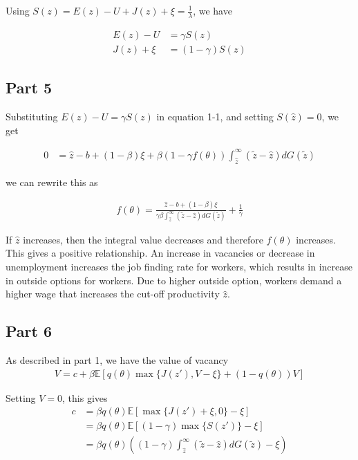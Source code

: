 Using $S(z) = E(z) - U + J(z) + \xi = \frac{1}{\lambda} $, we have 

\begin{align*}
    E(z) - U &= \gamma S(z)\\    
    J(z) + \xi &= (1-\gamma) S(z)
\end{align*}

\subsection*{Part 5}
Substituting $E(z) - U = \gamma S(z)$ in equation 1-1, and setting $S(\hat z) = 0$, we get

\begin{align*}
    0 &= \hat z -b + (1-\beta) \xi + \beta (1-\gamma f(\theta)) \int_{\hat z}^\infty (\tilde z-\hat z)dG(\tilde z) \tag{1-6}
\end{align*}

we can rewrite this as 

\begin{align*}
    f(\theta) = \frac{\hat z -b + (1-\beta) \xi}{\gamma\beta \int_{\hat z}^\infty (\tilde z-\hat z)dG(\tilde z)}+ \frac{1}{\gamma}
\end{align*}

If $\hat z$ increases, then the integral value decreases and therefore $f(\theta)$ increases. This gives a positive relationship. An increase in vacancies or decrease in unemployment increases the job finding rate for workers, which results in increase in outside options for workers. Due to higher outside option, workers demand a higher wage that increases the cut-off productivity $\hat z$. 

\subsection*{Part 6}

As described in part 1, we have the value of vacancy 
\begin{align*}
    V = c  + \beta \mathbb E[q(\theta) \max\{J(z'), V-\xi\}  + (1-q(\theta))V]
\end{align*}

Setting $V=0$, this gives 
\begin{align*}
    c &= \beta q(\theta) \mathbb E[\max\{J(z') + \xi, 0\} - \xi]\\
    &= \beta q(\theta) \mathbb E[(1-\gamma)\max\{S(z')\} - \xi]\\
    &= \beta q(\theta) \left((1-\gamma)\int_{\hat z}^\infty (\tilde z-\hat z)dG(\tilde z) - \xi\right) \tag{1-7}
\end{align*}

